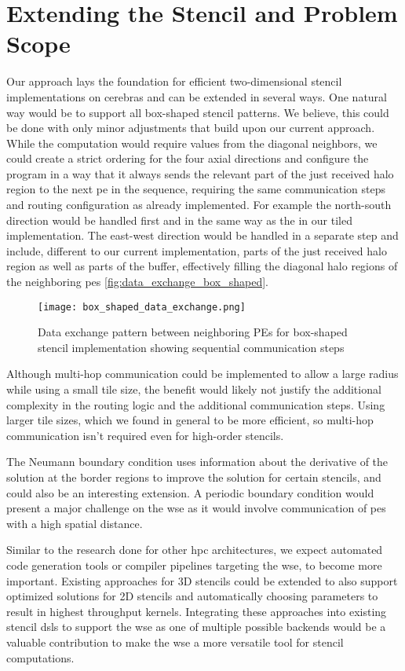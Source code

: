 \section{Extending the Stencil and Problem Scope}
Our approach lays the foundation for efficient two-dimensional stencil implementations on cerebras and can be extended in several ways.
One natural way would be to support all box-shaped stencil patterns.
We believe, this could be done with only minor adjustments that build upon our current approach.
While the computation would require values from the diagonal neighbors, we could create a strict ordering for the four axial directions and configure the program in a way that it always sends the relevant part of the just received halo region to the next \ac{pe} in the sequence, requiring the same communication steps and routing configuration as already implemented. For example the north-south direction would be handled first and in the same way as the in our tiled implementation. The east-west direction would be handled in a separate step and include, different to our current implementation, parts of the just received halo region as well as parts of the buffer, effectively filling the diagonal halo regions of the neighboring \acp{pe} \autoref{fig:data_exchange_box_shaped}.

\begin{figure}[h]
    \centering
    \texttt{[image: box\_shaped\_data\_exchange.png]}
    \caption{Data exchange pattern between neighboring PEs for box-shaped stencil implementation showing sequential communication steps}
    \label{fig:data_exchange_box_shaped}
\end{figure}

Although multi-hop communication could be implemented to allow a large radius while using a small tile size, the benefit would likely not justify the additional complexity in the routing logic and the additional communication steps. Using larger tile sizes, which we found in general to be more efficient, so multi-hop communication isn't required even for high-order stencils.

The Neumann boundary condition uses information about the derivative of the solution at the border regions to improve the solution for certain stencils, and could also be an interesting extension. A periodic boundary condition would present a major challenge on the \ac{wse} as it would involve communication of \acp{pe} with a high spatial distance. 

Similar to the research done for other \ac{hpc} architectures, we expect automated code generation tools or compiler pipelines targeting the \ac{wse}, to become more important.
Existing approaches for 3D stencils \cite{sai2024automated} could be extended to also support optimized solutions for 2D stencils and automatically choosing parameters to result in highest throughput kernels.
Integrating these approaches into existing stencil \acp{dsl} to support the \ac{wse} as one of multiple possible backends would be a valuable contribution to make the \ac{wse} a more versatile tool for stencil computations.